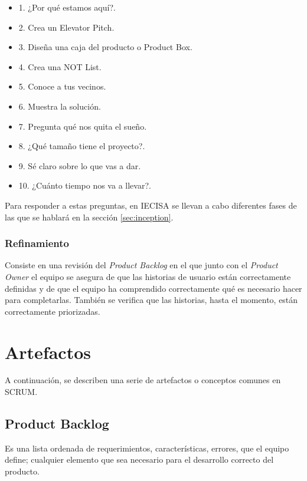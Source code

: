 \begin{multicols}{2}
	\begin{itemize}
		\item 1. ¿Por qué estamos aquí?.
    	\item 2. Crea un Elevator Pitch.
    	\item 3. Diseña una caja del producto o Product Box.
    	\item 4. Crea una NOT List.
    	\item 5. Conoce a tus vecinos.
    	\item 6. Muestra la solución.
    	\item 7. Pregunta qué nos quita el sueño.
    	\item 8. ¿Qué tamaño tiene el proyecto?.
    	\item 9. Sé claro sobre lo que vas a dar.
    	\item 10. ¿Cuánto tiempo nos va a llevar?.
	\end{itemize}
\end{multicols}

Para responder a estas preguntas, en IECISA se llevan a cabo diferentes fases de las que se hablará en la sección \ref{sec:inception}.
\subsubsection{Refinamiento}
\label{refinamiento}

Consiste en una revisión del \emph{Product Backlog} en el que junto con el \emph{Product Owner} el equipo se asegura de que las historias de usuario están correctamente definidas y de que el equipo ha comprendido correctamente qué es necesario hacer para completarlas. También se verifica que las historias, hasta el momento, están correctamente priorizadas.

\section{Artefactos}
\label{artefactos}

A continuación, se describen una serie de artefactos o conceptos comunes en SCRUM.

\subsection{Product Backlog}
\label{prductBacklog}

Es una lista ordenada de requerimientos, características, errores, que el equipo define; cualquier elemento que sea necesario para el desarrollo correcto del producto.

